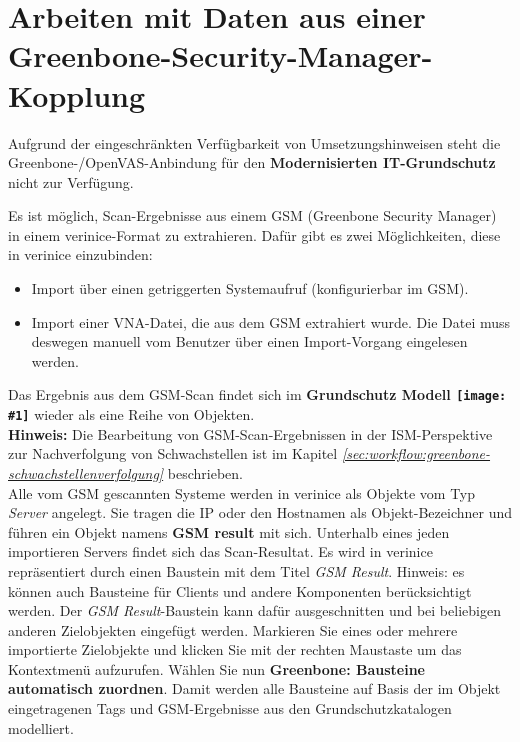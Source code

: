 \documentclass[a4paper,10pt]{book}
\newcommand{\icon}[1]{\texttt{[image: \#1]}}
\begin{document}
\section{Arbeiten mit Daten aus einer Greenbone-Security-Manager-Kopplung} \label{Arbeiten mit Daten aus einer Greenbone-Security-Manager-Kopplung}
Aufgrund der eingeschränkten Verfügbarkeit von Umsetzungshinweisen steht die Greenbone-/OpenVAS-Anbindung für den \textbf{Modernisierten IT-Grundschutz} nicht zur Verfügung.

Es ist möglich, Scan-Ergebnisse aus einem GSM (Greenbone Security Manager) in einem verinice-Format zu extrahieren.
Dafür gibt es zwei Möglichkeiten, diese in verinice einzubinden:
 \begin{itemize}
   \item Import über einen getriggerten Systemaufruf (konfigurierbar im GSM).
   \item Import einer VNA-Datei, die aus dem GSM extrahiert wurde. Die Datei muss deswegen manuell vom Benutzer
   über einen Import-Vorgang eingelesen werden.
 \end{itemize}
 Das Ergebnis aus dem GSM-Scan findet sich im \textbf{Grundschutz Modell \icon{Icon/GS_Modell.png}} wieder als eine Reihe von Objekten.
 \newline\\
 \textbf{Hinweis:} Die Bearbeitung von GSM-Scan-Ergebnissen in der ISM-Perspektive zur Nachverfolgung von Schwachstellen
 ist im Kapitel {\em \ref{sec:workflow:greenbone-schwachstellenverfolgung} \newline {}} beschrieben.
 \newline\\
Alle vom GSM gescannten Systeme werden in verinice als Objekte vom Typ
{\em Server} angelegt. Sie tragen die IP oder den Hostnamen als Objekt-Bezeichner und führen ein Objekt namens \textbf{GSM result} mit sich.
Unterhalb eines jeden importieren Servers findet sich das Scan-Resultat.
Es wird in verinice repräsentiert durch einen Baustein mit dem Titel
{\em GSM Result}.
Hinweis: es können auch Bausteine für Clients und andere Komponenten
berücksichtigt werden. Der {\em GSM Result}-Baustein kann dafür ausgeschnitten und
bei beliebigen anderen Zielobjekten eingefügt werden.
 Markieren Sie eines oder mehrere importierte Zielobjekte und klicken Sie mit der rechten Maustaste um das Kontextmenü aufzurufen. Wählen Sie nun
 \textbf{Greenbone: Bausteine automatisch zuordnen}. Damit werden alle Bausteine auf Basis
 der im Objekt eingetragenen Tags und GSM-Ergebnisse aus den Grundschutzkatalogen modelliert.
\end{document}
